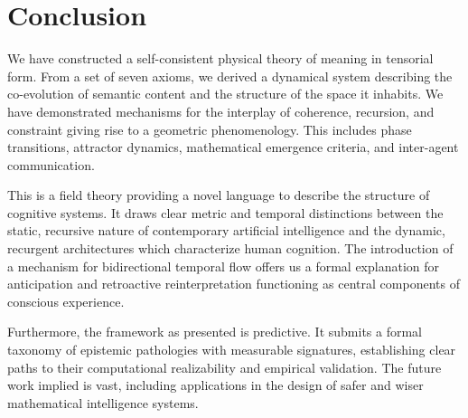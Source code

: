 
\section{Conclusion}
\label{17.7:conclusion}

We have constructed a self-consistent physical theory of meaning in tensorial form. From a set of seven axioms, we derived a dynamical system describing the co-evolution of semantic content and the structure of the space it inhabits. We have demonstrated mechanisms for the interplay of coherence, recursion, and constraint giving rise to a geometric phenomenology. This includes phase transitions, attractor dynamics, mathematical emergence criteria, and inter-agent communication.

This is a field theory providing a novel language to describe the structure of cognitive systems. It draws clear metric and temporal distinctions between the static, recursive nature of contemporary artificial intelligence and the dynamic, recurgent architectures which characterize human cognition. The introduction of a mechanism for bidirectional temporal flow offers us a formal explanation for anticipation and retroactive reinterpretation functioning as central components of conscious experience.

Furthermore, the framework as presented is predictive. It submits a formal taxonomy of epistemic pathologies with measurable signatures, establishing clear paths to their computational realizability and empirical validation. The future work implied is vast, including applications in the design of safer and wiser mathematical intelligence systems.